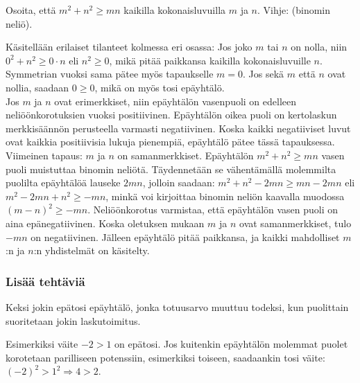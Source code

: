 \begin{tehtavasivu}
\begin{tehtava}
Osoita, että $m^2+n^2 \geq mn$ kaikilla kokonaisluvuilla $m$ ja $n$. Vihje: (binomin neliö).
		\begin{vastaus}
Käsitellään erilaiset tilanteet kolmessa eri osassa: 		
		Jos joko $m$ tai $n$ on nolla, niin $0^2+n^2 \geq 0\cdot n$ eli $n^2\geq 0$, mikä pitää paikkansa kaikilla kokonaisluvuille $n$. Symmetrian vuoksi sama pätee myös tapaukselle $m=0$. Jos sekä $m$ että $n$ ovat nollia, saadaan $0\geq 0$, mikä on myös tosi epäyhtälö. \\
		Jos $m$ ja $n$ ovat erimerkkiset, niin epäyhtälön vasenpuoli on edelleen neliöönkorotuksien vuoksi positiivinen. Epäyhtälön oikea puoli on kertolaskun merkkisäännön perusteella varmasti negatiivinen. Koska kaikki negatiiviset luvut ovat kaikkia positiivisia lukuja pienempiä, epäyhtälö pätee tässä tapauksessa. \\
		Viimeinen tapaus: $m$ ja $n$ on samanmerkkiset. Epäyhtälön $m^2+n^2 \geq mn$ vasen puoli muistuttaa binomin neliötä. Täydennetään se vähentämällä molemmilta puolilta epäyhtälöä lauseke $2mn$, jolloin saadaan: $m^2+n^2-2mn \geq mn-2mn$ eli $m^2-2mn+n^2 \geq -mn$, minkä voi kirjoittaa binomin neliön kaavalla muodossa $(m-n)^2 \geq -mn$. Neliöönkorotus varmistaa, että epäyhtälön vasen puoli on aina epänegatiivinen. Koska oletuksen mukaan $m$ ja $n$ ovat samanmerkkiset, tulo $-mn$ on negatiivinen. Jälleen epäyhtälö pitää paikkansa, ja kaikki mahdolliset $m$:n ja $n$:n yhdistelmät on käsitelty. 
		\end{vastaus}
\end{tehtava}

\subsubsection*{Lisää tehtäviä}

\begin{tehtava}
Keksi jokin epätosi epäyhtälö, jonka totuusarvo muuttuu todeksi, kun puolittain suoritetaan jokin laskutoimitus.
	\begin{vastaus}
	Esimerkiksi väite $-2>1$ on epätosi. Jos kuitenkin epäyhtälön molemmat puolet korotetaan parilliseen potenssiin, esimerkiksi toiseen, saadaankin tosi väite: $(-2)^2>1^2 \Rightarrow 4>2$.
	\end{vastaus}
\end{tehtava}


\end{tehtavasivu}
